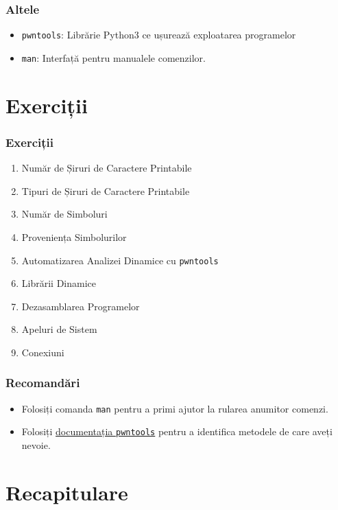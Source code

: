 \documentclass[xcolor={table}]{beamer}
\begin{document}
	\begin{frame}
		\frametitle{Altele}\pause
		\begin{itemize}[<+->]
		    \item \texttt{pwntools}: Librărie Python3 ce ușurează exploatarea programelor
		    \item \texttt{man}: Interfață pentru manualele comenzilor.
	    \end{itemize}
	\end{frame}
	
	\section{Exerciții}
	
	\begin{frame}
		\frametitle{Exerciții}\pause
		\begin{enumerate}
		    \item Număr de Șiruri de Caractere Printabile
		    \item Tipuri de Șiruri de Caractere Printabile
		    \item Număr de Simboluri
		    \item Proveniența Simbolurilor
		    \item Automatizarea Analizei Dinamice cu \texttt{pwntools}
		    \item Librării Dinamice
		    \item Dezasamblarea Programelor
		    \item Apeluri de Sistem
		    \item Conexiuni
	    \end{enumerate}
	\end{frame}
	
	\begin{frame}
		\frametitle{Recomandări}\pause
		\begin{itemize}[<+->]
		    \item Folosiți comanda \texttt{man} pentru a primi ajutor la rularea anumitor comenzi.
		    \item Folosiți \href{https://docs.pwntools.com/en/stable/}{documentația \texttt{pwntools}} pentru a identifica metodele de care aveți nevoie.
	    \end{itemize}
	\end{frame}
	
	\section{Recapitulare}
	
\end{document}
